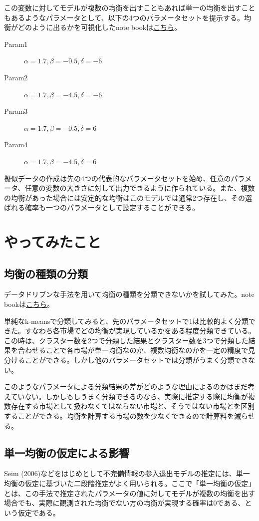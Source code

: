 \documentclass{jsarticle}
\begin{document}
この変数に対してモデルが複数の均衡を出すこともあれば単一の均衡を出すこともあるようなパラメータとして、以下の4つのパラメータセットを提示する。均衡がどのように出るかを可視化したnote bookは\href{https://github.com/keiikegami/multiplicity/blob/master/best_response_function.ipynb}{こちら}。
\begin{description}
	\item[Param1] $\alpha = 1.7, \beta = -0.5, \delta = -6$
	\item[Param2] $\alpha = 1.7, \beta = -4.5, \delta = -6$
	\item[Param3] $\alpha = 1.7, \beta = -0.5, \delta = 6$
	\item[Param4] $\alpha = 1.7, \beta = -4.5, \delta = 6$
\end{description}
擬似データの作成は先の4つの代表的なパラメータセットを始め、任意のパラメータ、任意の変数の大きさに対して出力できるように作られている。また、複数の均衡があった場合には安定的な均衡はこのモデルでは通常2つ存在し、その選ばれる確率も一つのパラメータとして設定することができる。

\section{やってみたこと}
\subsection{均衡の種類の分類}
データドリブンな手法を用いて均衡の種類を分類できないかを試してみた。note bookは\href{https://github.com/keiikegami/multiplicity/blob/master/prediction2.ipynb}{こちら}。

単純なk-meansで分類してみると、先のパラメータセットで1は比較的よく分類できた。すなわち各市場でどの均衡が実現しているかをある程度分類できている。この時は、クラスター数を2つで分類した結果とクラスター数を3つで分類した結果を合わせることで各市場が単一均衡なのか、複数均衡なのかを一定の精度で見分けることができる。しかし他のパラメータセットでは分類がうまく分類できない。

このようなパラメータによる分類結果の差がどのような理由によるのかはまだ考えていない。しかしもしうまく分類できるのなら、実際に推定する際に均衡が複数存在する市場として扱わなくてはならない市場と、そうではない市場とを区別することができる。均衡を計算する市場の数を少なくできるので計算料を減らせる。

\subsection{単一均衡の仮定による影響}
Seim (2006)などをはじめとして不完備情報の参入退出モデルの推定には、単一均衡の仮定に基づいた二段階推定がよく用いられる。ここで「単一均衡の仮定」とは、この手法で推定されたパラメータの値に対してモデルが複数の均衡を出す場合でも、実際に観測された均衡でない方の均衡が実現する確率は0である、という仮定である。
\end{document}
